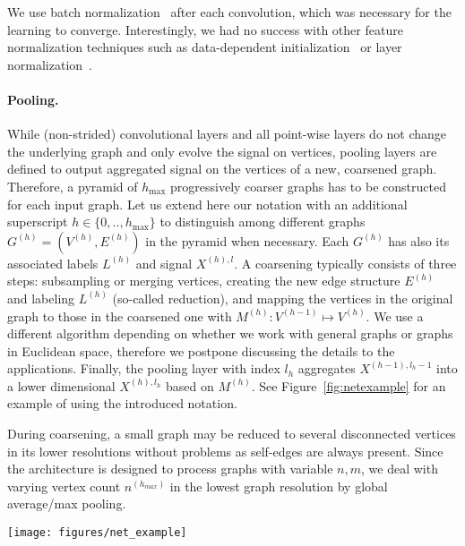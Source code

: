 \documentclass[10pt,twocolumn,letterpaper]{article}
\begin{document}
We use batch normalization~\cite{batchnorm} after each convolution, which was necessary for the learning to converge. Interestingly, we had no success with other feature normalization techniques such as data-dependent initialization~\cite{goodinit} or layer normalization~\cite{layernorm}.

\paragraph*{Pooling.} While (non-strided) convolutional layers and all point-wise layers do not change the underlying graph and only evolve the signal on vertices, pooling layers are defined to output aggregated signal on the vertices of a new, coarsened graph. Therefore, a pyramid of $h_\mathrm{max}$ progressively coarser graphs has to be constructed for each input graph. Let us extend here our notation with an additional superscript $h\in\{0,..,h_\mathrm{max}\}$ to distinguish among different graphs $G^{(h)}=(V^{(h)}, E^{(h)})$ in the pyramid when necessary. Each $G^{(h)}$ has also its associated labels $L^{(h)}$ and signal $X^{{(h)},l}$.
A coarsening typically consists of three steps: subsampling or merging vertices, creating the new edge structure $E^{(h)}$ and labeling $L^{(h)}$ (so-called reduction), and mapping the vertices in the original graph to those in the coarsened one with $M^{(h)}: V^{(h-1)}\mapsto V^{(h)}$. We use a different algorithm depending on whether we work with general graphs or graphs in Euclidean space, therefore we postpone discussing the details to the applications. Finally, the pooling layer with index $l_h$ aggregates $X^{(h-1),l_h-1}$ into a lower dimensional $X^{(h),l_h}$ based on $M^{(h)}$. See Figure~\ref{fig:netexample} for an example of using the introduced notation. 

During coarsening, a small graph may be reduced to several disconnected vertices in its lower resolutions without problems as self-edges are always present. Since the architecture is designed to process graphs with variable $n,m$, we deal with varying vertex count $n^{(h_{max})}$ in the lowest graph resolution by global average/max pooling. 


\begin{figure*}[bt]
\centering
\texttt{[image: figures/net\_example]}
\vspace{1.5ex}
\caption{\label{fig:netexample} Illustration of a deep network with three edge-conditioned convolutions (first, fourth, and eight network layer) and one pooling (seventh layer). The last convolution is executed on a structurally different graph $G^{(1)}$, which is related to the input graph $G^{(0)}$ by coarsening and signal aggregation in the max pooling step according to mapping $M^{(1)}$. See Section~\ref{subsec:eccnet} for more details.}
\end{figure*}
\end{document}

